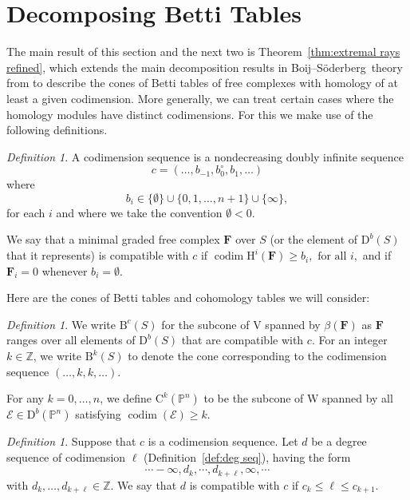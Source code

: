 \documentclass[12pt]{amsart}
\theoremstyle{definition}
\theoremstyle{remark}
\newtheorem{defn}[lemma]{Definition}
\newcommand{\codim}{\operatorname{codim}}
\newcommand{\PP}{\mathbb{P}}
\newcommand{\HH}{\mathrm{H}}
\newcommand{\ZZ}{\mathbb{Z}}
\newcommand{\VV}{\mathrm{V}}
\newcommand{\WW}{\mathrm{W}}
\newcommand{\cc}{c}
\newcommand{\dd}{d}
\newcommand{\cE}{\mathcal{E}}
\newcommand{\FF}{\mathbf{F}}
\newcommand{\defi}[1]{\textsf{#1}} %
\newcommand{\nothing}{\emptyset}
\newcommand{\DD}{\mathrm{D}}
\newcommand{\CQ}{\mathrm{C}}
\newcommand{\BBQ}{\mathrm{B}}
\def\BS{Boij--S\"oderberg~}
\begin{document}
\section{Decomposing Betti Tables}\label{sec:refined}
The main result of this section and the next two is Theorem~\ref{thm:extremal rays refined},
which extends the main decomposition results in \BS theory from \cites{eis-schrey1,boij-sod2}
to describe the cones of Betti tables of free complexes with  homology of at least a given codimension. More generally, we can treat certain cases where the homology modules have distinct codimensions. For this we make use of the following definitions.

\begin{defn} A \defi{codimension sequence} is a nondecreasing
doubly infinite sequence
$$
\cc=(\dots, b_{-1}, b_{0}^{\circ}, b_{1}, \dots )
$$
where  
$$
b_{i}\in \{\nothing\} \cup \{0,1,\dots,n+1\}\cup \{\infty\},
$$
for each $i$ and where we take the convention $\nothing<0$.  

We say that a
minimal graded free complex $\FF$ over $S$ (or the element of $\DD^{b}(S)$ that it represents) is \defi{compatible with $\cc$} if 
$
\codim \HH^i(\FF) \geq b_i, \text{ for all } i,
$
and if $\FF_i=0$ whenever $b_i=\nothing$.
\end{defn}

Here are the cones of Betti tables and cohomology tables we will consider:

\begin{defn}\label{defn:cones}
We write $\BBQ^{\cc}(S)$ for the subcone of $\VV$ spanned by $\beta(\FF)$ as $\FF$ ranges over all elements of $\DD^b(S)$ that are compatible with $\cc$.  For an integer $k\in \ZZ$, we write $\BBQ^k(S)$ to denote the cone corresponding to the codimension sequence $(\dots, k,k,\dots)$.

For any $k=0, \dots, n$, we define $\CQ^k(\PP^n)$ to be the subcone of $\WW$ spanned by all $\cE\in \DD^b(\PP^n)$ satisfying $\codim(\cE)\geq k$.
\end{defn}

\begin{defn}\label{defn:deg compatible}
Suppose that $\cc$ is a codimension sequence. Let $\dd$ be a degree sequence 
of codimension $\ell$ (Definition~\ref{def:deg seq}), having the form
$$
\cdots -\infty, d_{k}, \cdots, d_{k+\ell}, \infty, \cdots
$$
with $d_{k},\dots, d_{k+\ell}\in \ZZ$.
We say that $\dd$ is \defi{compatible} with $\cc$ if $c_{k}\leq \ell \leq c_{k+1}$. 
\end{defn}
\end{document}
